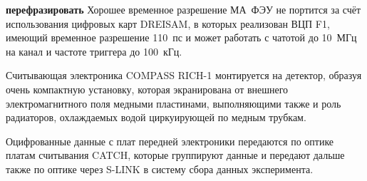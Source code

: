 \todo \textbf{перефразировать}
Хорошее временное разрешение МА~ФЭУ не портится за счёт использования цифровых карт DREISAM, в которых реализован ВЦП F1, имеющий временное разрешение 110~пс и может работать с чатотой до 10~МГц на канал и частоте триггера до 100~кГц.


Считывающая электроника COMPASS \mbox{RICH-1} монтируется на детектор, образуя очень компактную установку, которая экранирована от внешнего электромагнитного поля медными пластинами, выполняющими также и роль радиаторов, охлаждаемых водой циркуирующей по медным трубкам.


Оцифрованные данные с плат передней электроники передаются по оптике платам считывания CATCH, которые группируют данные и передают дальше также по оптике через S-LINK в систему сбора данных эксперимента.



